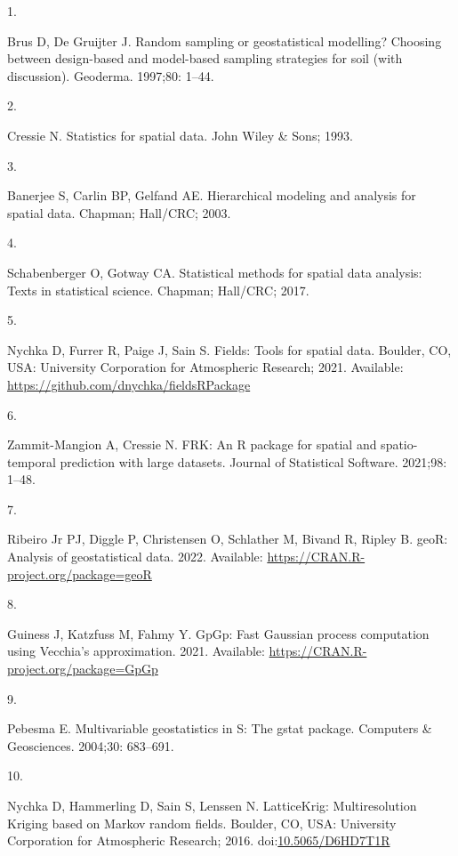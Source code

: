 \documentclass[10pt,letterpaper]{article}
\newlength{\cslhangindent}
\newlength{\csllabelwidth}
\newlength{\cslentryspacingunit} %
\newenvironment{CSLReferences}[2] %
 {%
  \setlength{\parindent}{0pt}
  \ifodd #1
  \let\oldpar\par
  \def\par{\hangindent=\cslhangindent\oldpar}
  \fi
  \setlength{\parskip}{#2\cslentryspacingunit}
 }%
 {}
\newcommand{\CSLLeftMargin}[1]{\parbox[t]{\csllabelwidth}{#1}}
\newcommand{\CSLRightInline}[1]{\parbox[t]{\linewidth - \csllabelwidth}{#1}\break}
\begin{document}
\hypertarget{refs}{}
\begin{CSLReferences}{0}{0}
\leavevmode\hypertarget{ref-brus1997random}{}%
\CSLLeftMargin{1. }
\CSLRightInline{Brus D, De Gruijter J. Random sampling or geostatistical
modelling? {Choosing} between design-based and model-based sampling
strategies for soil (with discussion). Geoderma. 1997;80: 1--44. }

\leavevmode\hypertarget{ref-cressie1993statistics}{}%
\CSLLeftMargin{2. }
\CSLRightInline{Cressie N. Statistics for spatial data. John Wiley \&
Sons; 1993. }

\leavevmode\hypertarget{ref-banerjee2003hierarchical}{}%
\CSLLeftMargin{3. }
\CSLRightInline{Banerjee S, Carlin BP, Gelfand AE. Hierarchical modeling
and analysis for spatial data. Chapman; Hall/CRC; 2003. }

\leavevmode\hypertarget{ref-schabenberger2017statistical}{}%
\CSLLeftMargin{4. }
\CSLRightInline{Schabenberger O, Gotway CA. Statistical methods for
spatial data analysis: Texts in statistical science. Chapman; Hall/CRC;
2017. }

\leavevmode\hypertarget{ref-nychka2021fields}{}%
\CSLLeftMargin{5. }
\CSLRightInline{Nychka D, Furrer R, Paige J, Sain S. Fields: Tools for
spatial data. Boulder, CO, USA: University Corporation for Atmospheric
Research; 2021. Available:
\url{https://github.com/dnychka/fieldsRPackage}}

\leavevmode\hypertarget{ref-zammitmangion2021FRK}{}%
\CSLLeftMargin{6. }
\CSLRightInline{Zammit-Mangion A, Cressie N. FRK: An {R} package for
spatial and spatio-temporal prediction with large datasets. Journal of
Statistical Software. 2021;98: 1--48. }

\leavevmode\hypertarget{ref-ribiero2022geoR}{}%
\CSLLeftMargin{7. }
\CSLRightInline{Ribeiro Jr PJ, Diggle P, Christensen O, Schlather M,
Bivand R, Ripley B. {geoR}: Analysis of geostatistical data. 2022.
Available: \url{https://CRAN.R-project.org/package=geoR}}

\leavevmode\hypertarget{ref-guiness2021gpgp}{}%
\CSLLeftMargin{8. }
\CSLRightInline{Guiness J, Katzfuss M, Fahmy Y. GpGp: Fast {G}aussian
process computation using {V}ecchia's approximation. 2021. Available:
\url{https://CRAN.R-project.org/package=GpGp}}

\leavevmode\hypertarget{ref-pebesma2004gstat}{}%
\CSLLeftMargin{9. }
\CSLRightInline{Pebesma E. Multivariable geostatistics in {S}: The gstat
package. Computers \& Geosciences. 2004;30: 683--691. }

\leavevmode\hypertarget{ref-nychka2016latticekrig}{}%
\CSLLeftMargin{10. }
\CSLRightInline{Nychka D, Hammerling D, Sain S, Lenssen N.
{LatticeKrig}: Multiresolution {K}riging based on {M}arkov random
fields. Boulder, CO, USA: University Corporation for Atmospheric
Research; 2016.
doi:\href{https://doi.org/10.5065/D6HD7T1R}{10.5065/D6HD7T1R}}


\end{CSLReferences}
\end{document}
